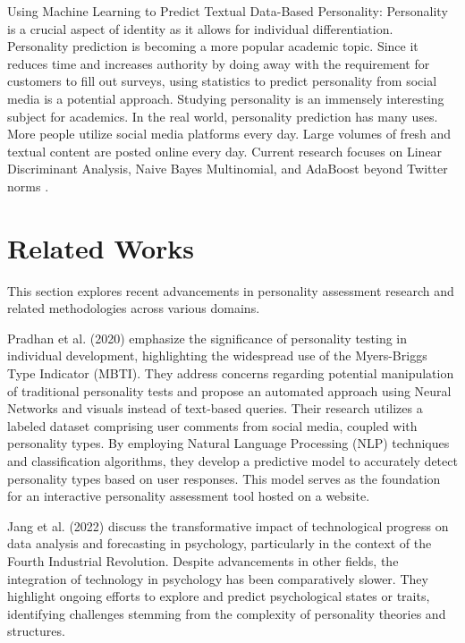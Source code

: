 \documentclass[conference]{IEEEtran}
\begin{document}
    Using Machine Learning to Predict Textual Data-Based Personality: Personality is a crucial aspect
    of identity as it allows for individual differentiation. Personality prediction is becoming a
    more popular academic topic. Since it reduces time and increases authority by doing away with the
    requirement for customers to fill out surveys, using statistics to predict personality from
    social media is a potential approach. Studying personality is an immensely interesting subject for
    academics. In the real world, personality prediction has many uses. More people utilize social
    media platforms every day. Large volumes of fresh and textual content are posted online every day.
    Current research focuses on Linear Discriminant Analysis, Naive Bayes Multinomial, and AdaBoost
    beyond Twitter norms \cite{b4}.

    \section{Related Works}
    This section explores recent advancements in personality assessment research and related
    methodologies across various domains.

    Pradhan et al. (2020) emphasize the significance of personality testing in individual development,
    highlighting the widespread use of the Myers-Briggs Type Indicator (MBTI). They address concerns
    regarding potential manipulation of traditional personality tests and propose an automated approach
    using Neural Networks and visuals instead of text-based queries. Their research utilizes a
    labeled dataset comprising user comments from social media, coupled with personality types. By
    employing Natural Language Processing (NLP) techniques and classification algorithms, they develop
    a predictive model to accurately detect personality types based on user responses. This model
    serves as the foundation for an interactive personality assessment tool hosted on a website.

    Jang et al. (2022) discuss the transformative impact of technological progress on data analysis and
    forecasting in psychology, particularly in the context of the Fourth Industrial Revolution. Despite
    advancements in other fields, the integration of technology in psychology has been comparatively
    slower. They highlight ongoing efforts to explore and predict psychological states or traits,
    identifying challenges stemming from the complexity of personality theories and structures.
\end{document}
